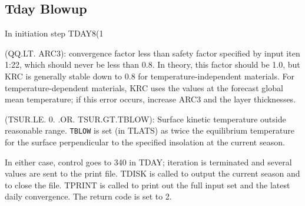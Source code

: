 \documentclass{article}
\newcommand{\nv}{\texttt}  %
\begin{document}
\subsection{Tday Blowup} %
In initiation step TDAY8(1

 (QQ.LT. ARC3): convergence factor less than safety factor specified by input
iten 1:22, which should never be less than 0.8. In theory, this factor should be
1.0, but KRC is generally stable down to 0.8 for temperature-independent
materials. For temperature-dependent materials, KRC uses the values at the
forecast global mean temperature; if this error occurs, increase ARC3 and the
layer thicknesses.

 (TSUR.LE. 0. .OR. TSUR.GT.TBLOW): Surface kinetic temperature outside
reasonable range. \nv{TBLOW} is set (in TLATS) as twice the equilibrium
temperature for the surface perpendicular to the specified insolation at the
current season.

In either case, control goes to 340 in TDAY; iteration is terminated and several
values are sent to the print file. TDISK is called to output the current season
and to close the file. TPRINT is called to print out the full input set and the
latest daily convergence. The return code is set to 2.
\end{document}
